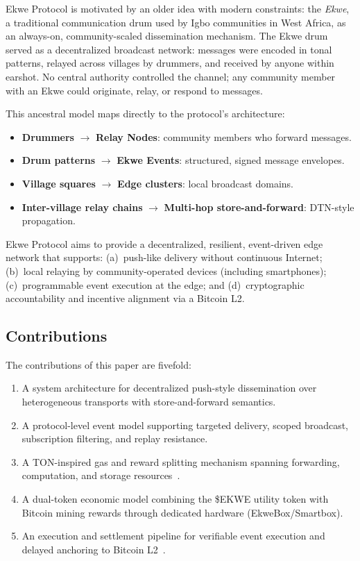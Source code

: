 \documentclass[11pt,a4paper]{article}
\begin{document}
Ekwe Protocol is motivated by an older idea with modern constraints: the \textit{Ekwe}, a traditional communication drum used by Igbo communities in West Africa, as an always-on, community-scaled dissemination mechanism. The Ekwe drum served as a decentralized broadcast network: messages were encoded in tonal patterns, relayed across villages by drummers, and received by anyone within earshot. No central authority controlled the channel; any community member with an Ekwe could originate, relay, or respond to messages.

This ancestral model maps directly to the protocol's architecture:
\begin{itemize}[nosep]
  \item \textbf{Drummers} $\rightarrow$ \textbf{Relay Nodes}: community members who forward messages.
  \item \textbf{Drum patterns} $\rightarrow$ \textbf{Ekwe Events}: structured, signed message envelopes.
  \item \textbf{Village squares} $\rightarrow$ \textbf{Edge clusters}: local broadcast domains.
  \item \textbf{Inter-village relay chains} $\rightarrow$ \textbf{Multi-hop store-and-forward}: DTN-style propagation.
\end{itemize}

Ekwe Protocol aims to provide a decentralized, resilient, event-driven edge network that supports: (a)~push-like delivery without continuous Internet; (b)~local relaying by community-operated devices (including smartphones); (c)~programmable event execution at the edge; and (d)~cryptographic accountability and incentive alignment via a Bitcoin L2.

\subsection{Contributions}

The contributions of this paper are fivefold:
\begin{enumerate}[nosep]
  \item A system architecture for decentralized push-style dissemination over heterogeneous transports with store-and-forward semantics.
  \item A protocol-level event model supporting targeted delivery, scoped broadcast, subscription filtering, and replay resistance.
  \item A TON-inspired gas and reward splitting mechanism spanning forwarding, computation, and storage resources~\cite{ton_fees}.
  \item A dual-token economic model combining the \$EKWE utility token with Bitcoin mining rewards through dedicated hardware (EkweBox/Smartbox).
  \item An execution and settlement pipeline for verifiable event execution and delayed anchoring to Bitcoin L2~\cite{sok_btc_l2}.
\end{enumerate}
\end{document}
